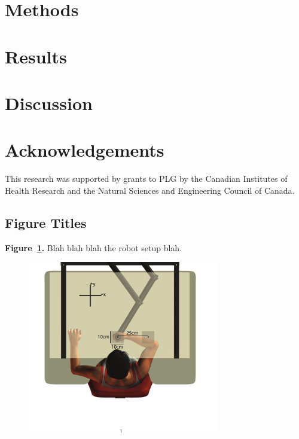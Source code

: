 \documentclass[12pt]{article}
\begin{document}
\section*{Methods}

\lipsum[1-3]

\section*{Results}

\lipsum[1-3]

\section*{Discussion}

\lipsum[1-3]

\newpage
\section*{Acknowledgements}
This research was supported by grants to PLG by the Canadian Institutes of Health Research and the Natural Sciences and Engineering Council of Canada.

\newpage
 


\newpage
\subsection*{Figure Titles}
\begin{flushleft}

\vspace{.5cm}
{\bf Figure~\ref{fig:setupfig}.} Blah blah blah the robot setup blah.

\end{flushleft}

\newpage
\clearpage
\begin{figure}[H]
	\centering
    \includegraphics[height=3in]{articletemplatefigure.pdf}
 \caption{}
 \label{fig:setupfig}
\end{figure}
\end{document}
